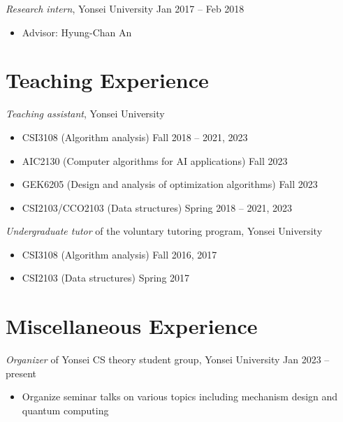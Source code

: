 \documentclass{article}
\newcommand{\killinitspace}{-0.7em}
\begin{document}
\textsl{Research intern}, Yonsei University \hfill Jan 2017 -- Feb 2018
\vspace{\killinitspace}
\begin{itemize}
\item Advisor: Hyung-Chan An
\end{itemize}

\section{Teaching Experience}
\textsl{Teaching assistant}, Yonsei University
\vspace{\killinitspace}
\begin{itemize}
\item CSI3108 (Algorithm analysis) \hfill Fall 2018 -- 2021, 2023
\item AIC2130 (Computer algorithms for AI applications) \hfill Fall 2023
\item GEK6205 (Design and analysis of optimization algorithms) \hfill Fall 2023
\item CSI2103/CCO2103 (Data structures) \hfill Spring 2018 -- 2021, 2023
\end{itemize}

\textsl{Undergraduate tutor} of the voluntary tutoring program, Yonsei University
\vspace{\killinitspace}
\begin{itemize}
\item CSI3108 (Algorithm analysis) \hfill Fall 2016, 2017
\item CSI2103 (Data structures) \hfill Spring 2017
\end{itemize}


\section{Miscellaneous Experience}
\textsl{Organizer} of Yonsei CS theory student group, Yonsei University \hfill Jan 2023 -- present
\vspace{\killinitspace}
\begin{itemize}
\item Organize seminar talks on various topics including mechanism design and quantum computing
\end{itemize}
\end{document}
